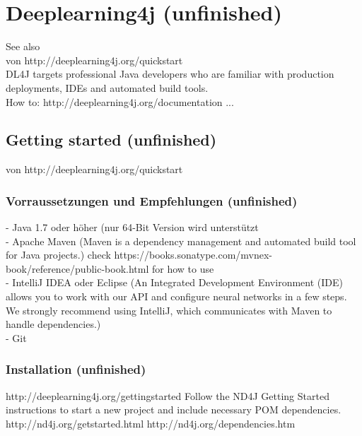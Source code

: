 \chapter{Deeplearning4j (unfinished)}
{See also \cite{DL4J}\\
von http://deeplearning4j.org/quickstart\\
DL4J targets professional Java developers who are familiar with production deployments, IDEs and automated build tools.\\

How to:
http://deeplearning4j.org/documentation
...

\section{Getting started (unfinished)}
von http://deeplearning4j.org/quickstart\\

\subsection{Vorraussetzungen und Empfehlungen (unfinished)}
- Java 1.7 oder höher (nur 64-Bit Version wird unterstützt\\
- Apache Maven (Maven is a dependency management and automated build tool for Java projects.) check https://books.sonatype.com/mvnex-book/reference/public-book.html for how to use\\
- IntelliJ IDEA oder Eclipse (An Integrated Development Environment (IDE) allows you to work with our API and configure neural networks in a few steps. We strongly recommend using IntelliJ, which communicates with Maven to handle dependencies.)\\
- Git

\subsection{Installation (unfinished)}
http://deeplearning4j.org/gettingstarted
Follow the ND4J Getting Started instructions to start a new project and include necessary POM dependencies.
http://nd4j.org/getstarted.html
http://nd4j.org/dependencies.htm

}
